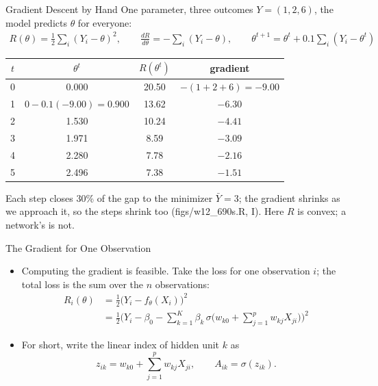 \documentclass[aspectratio=169,11pt,xcolor=dvipsnames]{beamer}
\newcommand{\srcp}[1]{{\scriptsize\color{gray}(#1)}}
\newcommand{\adv}{\,\raisebox{0.6pt}{\textcolor{accent}{$\bigstar$}}}
\begin{document}
\begin{frame}{Gradient Descent by Hand}
One parameter, three outcomes $Y = (1, 2, 6)$, the model predicts $\theta$ for everyone:
\begin{align*}
  R(\theta) = \tfrac12\sum_i (Y_i - \theta)^2, \qquad
  \frac{dR}{d\theta} = -\sum_i (Y_i - \theta), \qquad
  \theta^{t+1} = \theta^t + 0.1\sum_i (Y_i - \theta^t)
\end{align*}
\vskip-2pt
\begin{center}\small
\renewcommand{\arraystretch}{1.08}
\begin{tabular}{@{}cccc@{}}
\toprule
$t$ & $\theta^t$ & $R(\theta^t)$ & gradient \\
\midrule
0 & 0.000 & 20.50 & $-(1 + 2 + 6) = -9.00$ \\
1 & $0 - 0.1(-9.00) = 0.900$ & 13.62 & $-6.30$ \\
2 & 1.530 & 10.24 & $-4.41$ \\
3 & 1.971 & 8.59 & $-3.09$ \\
4 & 2.280 & 7.78 & $-2.16$ \\
5 & 2.496 & 7.38 & $-1.51$ \\
\bottomrule
\end{tabular}
\end{center}
\vskip-2pt
{\small Each step closes 30\% of the gap to the minimizer $\bar Y = 3$; the gradient shrinks as
we approach it, so the steps shrink too \srcp{figs/w12\_690s.R, I}. Here $R$ is convex; a network's is not.}
\end{frame}

\begin{frame}{The Gradient for One Observation\adv}
\begin{itemize}\itemsep4pt
  \item Computing the gradient is feasible. Take the loss for one observation $i$;
        the total loss is the sum over the $n$ observations:
  \begin{align*}
    R_i(\theta) &= \tfrac12\big(Y_i - f_\theta(X_i)\big)^2 \\
    &= \tfrac12\Big(Y_i - \beta_0 - \sum_{k=1}^K \beta_k\,\sigma\Big(w_{k0} + \sum_{j=1}^p w_{kj}X_{ji}\Big)\Big)^2
  \end{align*}
  \item For short, write the linear index of hidden unit $k$ as
  \[
    z_{ik} = w_{k0} + \sum_{j=1}^p w_{kj}X_{ji}, \qquad A_{ik} = \sigma(z_{ik}).
  \]
\end{itemize}
\end{frame}
\end{document}
